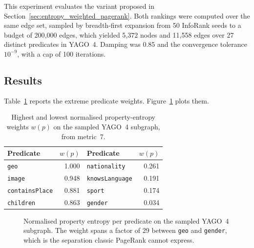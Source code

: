 This experiment evaluates the variant proposed in
Section~\ref{sec:entropy_weighted_pagerank}. Both rankings were computed over the
same edge set, sampled by breadth-first expansion from 50 InfoRank seeds to a
budget of 200{,}000 edges, which yielded 5{,}372 nodes and 11{,}558 edges over 27
distinct predicates in YAGO~4. Damping was 0.85 and the convergence tolerance
$10^{-9}$, with a cap of 100 iterations.

\subsection{Results}

Table~\ref{tab:weights} reports the extreme predicate weights.
Figure~\ref{fig:weights} plots them.

\begin{table}[htbp]
  \centering
  \caption[]{Highest and lowest normalised property-entropy
    weights $w(p)$ on the sampled YAGO~4 subgraph, from metric~7.}
  \label{tab:weights}
  \footnotesize
  \begin{tabular}{lr@{\hskip 2cm}lr}
    \toprule
    Predicate & $w(p)$ & Predicate & $w(p)$ \\
    \midrule
    \texttt{geo}           & 1.000 & \texttt{nationality}    & 0.261 \\
    \texttt{image}         & 0.948 & \texttt{knowsLanguage}  & 0.191 \\
    \texttt{containsPlace} & 0.881 & \texttt{sport}          & 0.174 \\
    \texttt{children}      & 0.863 & \texttt{gender}         & 0.034 \\
    \bottomrule
  \end{tabular}
\end{table}

\begin{figure}[htbp]
  \centering
  \caption[]{Normalised property
    entropy per predicate on the sampled YAGO~4 subgraph. The weight spans a
    factor of 29 between \texttt{geo} and \texttt{gender}, which is the
    separation classic PageRank cannot express.}
  \label{fig:weights}
\end{figure}

